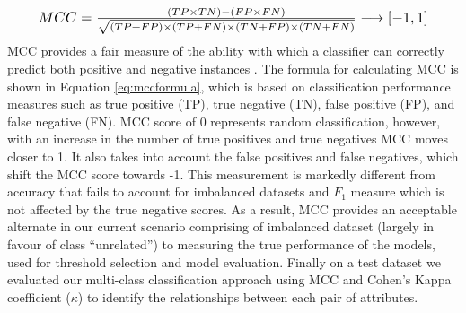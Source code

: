\documentclass{ieeeaccess}
\begin{document}
\begin{equation}
\label{eq:mccformula}
\resizebox{0.9\hsize}{!}{$%
	MCC = \frac{(TP \times TN) - (FP \times FN)}{\sqrt{(TP+FP)\times(TP+FN)\times(TN+FP)\times(TN+FN)}}\longrightarrow [-1,1]
	$%
}%
\end{equation}
MCC provides a fair measure of the ability with which a classifier can correctly predict both positive and negative instances \cite{chicco2020advantages}. The formula for calculating MCC is shown in Equation \ref{eq:mccformula}, which is based on classification performance measures such as true positive (TP), true negative (TN), false positive (FP), and false negative (FN). MCC score of 0 represents random classification, however, with an increase in the number of true positives and true negatives MCC moves closer to 1. It also takes into account the false positives and false negatives, which shift the MCC score towards -1. This measurement is markedly different from accuracy that fails to account for imbalanced datasets and $F_1$ measure which is not affected by the true negative scores. As a result, MCC provides an acceptable alternate in our current scenario comprising of imbalanced dataset (largely in favour of class ``unrelated'') to measuring the true performance of the models, used for threshold selection and model evaluation. Finally on a test dataset we evaluated our multi-class classification approach using MCC and Cohen's Kappa coefficient ($\kappa$) \cite{gwet2014handbook} to identify the relationships between each pair of attributes.
\end{document}
